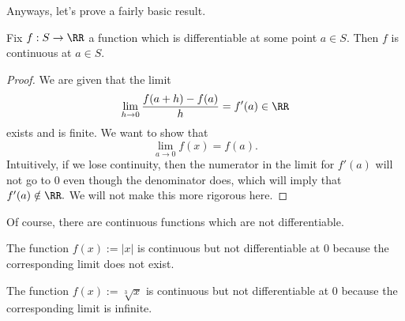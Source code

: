 \documentclass[../notes.tex]{subfiles}
\begin{document}
Anyways, let's prove a fairly basic result.
\begin{proposition}
	Fix $f:S\to\RR$ a function which is differentiable at some point $a\in S.$ Then $f$ is continuous at $a\in S.$
\end{proposition}
\begin{proof}
	We are given that the limit
	\[\lim_{h\to0}\frac{f(a+h)-f(a)}h=f'(a)\in\RR\]
	exists and is finite. We want to show that
	\[\lim_{a\to0}f(x)=f(a).\]
	Intuitively, if we lose continuity, then the numerator in the limit for $f'(a)$ will not go to $0$ even though the denominator does, which will imply that $f'(a)\notin\RR.$ We will not make this more rigorous here.
\end{proof}
Of course, there are continuous functions which are not differentiable.
\begin{example}
	The function $f(x):=|x|$ is continuous but not differentiable at $0$ because the corresponding limit does not exist.
\end{example}
\begin{example}
	The function $f(x):=\sqrt[3]x$ is continuous but not differentiable at $0$ because the corresponding limit is infinite.
\end{example}
\end{document}

